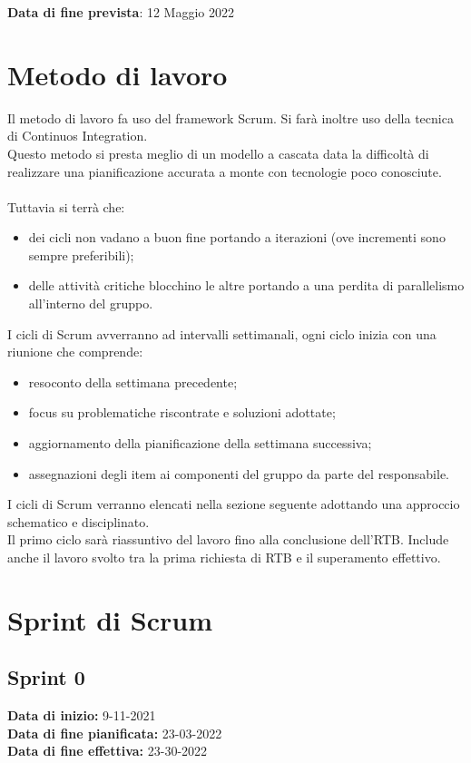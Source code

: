 \documentclass[a4paper, 12pt]{article}
\begin{document}
\textbf{Data di fine prevista}: 12 Maggio 2022

\section{Metodo di lavoro}
Il metodo di lavoro fa uso del framework Scrum. Si farà inoltre uso della tecnica di Continuos Integration.\\
Questo metodo si presta meglio di un modello a cascata data la difficoltà di realizzare una pianificazione accurata a monte con tecnologie poco conosciute.\\\\
Tuttavia si terrà che:
\begin{itemize}
    \item dei cicli non vadano a buon fine portando a iterazioni (ove incrementi sono sempre preferibili);
    \item delle attività critiche blocchino le altre portando a una perdita di parallelismo all'interno del gruppo.
\end{itemize}
I cicli di Scrum avverranno ad intervalli settimanali, ogni ciclo inizia con una riunione che comprende:
\begin{itemize}
    \item resoconto della settimana precedente;
    \item focus su problematiche riscontrate e soluzioni adottate;
    \item aggiornamento della pianificazione della settimana successiva;
    \item assegnazioni degli item ai componenti del gruppo da parte del responsabile.
\end{itemize}
I cicli di Scrum verranno elencati nella sezione seguente adottando una approccio schematico e disciplinato.\\
Il primo ciclo sarà riassuntivo del lavoro fino alla conclusione dell'RTB. Include anche il lavoro svolto tra la prima richiesta di RTB e il superamento effettivo.

\section{Sprint di Scrum}

\subsection{Sprint 0}
\textbf{Data di inizio:} 9-11-2021\\
\textbf{Data di fine pianificata:} 23-03-2022\\
\textbf{Data di fine effettiva:} 23-30-2022
\end{document}
